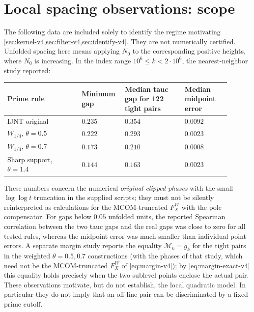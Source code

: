 \documentclass[11pt,a4paper]{article}
\numberwithin{equation}{section}
\theoremstyle{definition}
\theoremstyle{remark}
\begin{document}
\section{Local spacing observations: scope}
\label{sec:observed-v4}
The following data are included solely to identify the regime
motivating \cref{sec:kernel-v4,sec:filter-v4,sec:identify-v4}. They are
not numerically certified.
Unfolded spacing here means applying $N_0$ to the corresponding
positive heights, where $N_0$ is increasing. In the index range
$10^6\le k<2\cdot10^6$, the nearest-neighbor study reported:
\begin{center}\footnotesize
\begin{tabular}{@{}p{0.31\linewidth}p{0.15\linewidth}p{0.25\linewidth}p{0.19\linewidth}@{}}
\toprule
Prime rule & Minimum gap & Median tauc gap for 122 tight pairs & Median midpoint error\\
\midrule
IJNT original & $0.235$ & $0.354$ & $0.0092$\\
$W_{1/4}$, $\theta=0.5$ & $0.222$ & $0.293$ & $0.0023$\\
$W_{1/4}$, $\theta=0.7$ & $0.173$ & $0.210$ & $0.0008$\\
Sharp support, $\theta=1.4$ & $0.144$ & $0.163$ & $0.0023$\\
\bottomrule
\end{tabular}
\end{center}
These numbers concern the numerical \emph{original clipped phases}
with the small $\log\log t$ truncation in the supplied scripts; they
must not be silently reinterpreted as calculations for the
MCOM-truncated $F_X^W$ with the pole compensator.
For gaps below $0.05$ unfolded units, the reported Spearman
correlation between the two tauc gaps and the real gaps was close
to zero for all tested rules, whereas the midpoint error was much
smaller than individual point errors. A separate margin study
reports the equality $\mathcal M_k=g_k$ for the tight pairs in the weighted
$\theta=0.5,0.7$ constructions (with the phases of that study, which need not be the MCOM-truncated $F_X^W$ of \eqref{eq:margin-v4}); by
\eqref{eq:margin-exact-v4} this equality holds precisely when the two sublevel points enclose the
actual pair. These observations motivate, but do not establish, the
local quadratic model. In particular they do not imply that an
off-line pair can be discriminated by a fixed prime cutoff.




\end{document}

